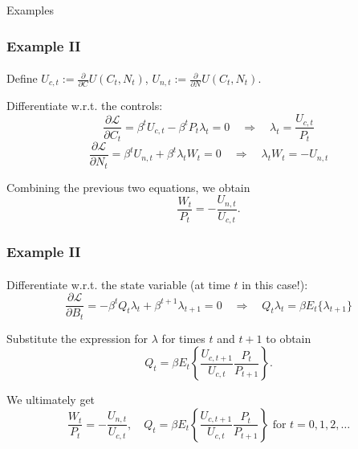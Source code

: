 \documentclass[10pt]{beamer}
\theoremstyle{definition}
\begin{document}
\begin{section}{Examples}
\begin{frame}
\frametitle{Example II}
\framesubtitle{}
Define $ U_{c,t} := \frac{\partial}{\partial C}U(C_t,N_t)$, $ U_{n,t} := \frac{\partial}{\partial N}U(C_t,N_t)$.\bigskip

Differentiate w.r.t. the controls:
\[ \frac{\partial \mathcal{L} }{\partial C_t} = \beta^t U_{c,t} - \beta^t P_t \lambda_t = 0 \quad\Longrightarrow\quad \lambda_t = \frac{U_{c,t}}{P_t} \]
\[  \frac{\partial \mathcal{L} }{\partial N_t} = \beta^t U_{n,t}+\beta^t \lambda_t W_t =0 \quad\Longrightarrow\quad \lambda_t W_t = -U_{n,t}  \]\bigskip

Combining the previous two equations, we obtain \[ \frac{W_t}{P_t} = -\frac{U_{n,t}}{U_{c,t}}. \]
\end{frame}




\begin{frame}
\frametitle{Example II}
\framesubtitle{}
Differentiate w.r.t. the state variable (at time $ t $ in this case!):
\[ \frac{\partial \mathcal{L} }{\partial B_t} = -\beta^t Q_t \lambda_t + \beta^{t+1}\lambda_{t+1} = 0 \quad\Longrightarrow\quad Q_t \lambda_t = \beta E_t \{\lambda_{t+1}\} \]

Substitute the expression for $ \lambda $ for times $ t $ and $ t+1 $ to obtain 
\[ Q_t = \beta E_t \left\{ \frac{U_{c,t+1}}{U_{c,t}}\frac{P_t}{P_{t+1}} \right\} .  \]

We ultimately get \[ \frac{W_t}{P_t} = -\frac{U_{n,t}}{U_{c,t}}, \quad Q_t = \beta E_t \left\{ \frac{U_{c,t+1}}{U_{c,t}}\frac{P_t}{P_{t+1}} \right\} \text{ for } t=0,1,2,\ldots \]

\end{frame}

\end{section}
\end{document}
